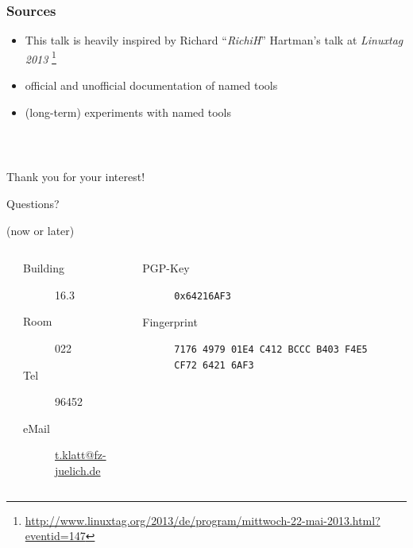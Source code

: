 \documentclass[english,hyperref={pdfpagelabels=false},aspectratio=169]{beamer}
\begin{document}
\begin{frame}
  \frametitle{Sources}
  \begin{itemize}
    \item This talk is heavily inspired by Richard ``\textit{RichiH}'' Hartman's talk at \textit{Linuxtag 2013}
      \footnote{\tiny\url{http://www.linuxtag.org/2013/de/program/mittwoch-22-mai-2013.html?eventid=147}}
    \item official and unofficial documentation of named tools
    \item (long-term) experiments with named tools
  \end{itemize}
\end{frame}

\begin{frame}
  \frametitle{~}
  \begin{center}
    {\huge Thank you for your interest!}\par
    \bigskip
    \bigskip
    \bigskip
    {\Large Questions?}\par
    {\scriptsize\color{fzjgray50}(now or later)}\par
    \bigskip
    \bigskip
    \begin{columns}
      \tiny
      \begin{column}{0.1\textwidth}
      \end{column}
      \begin{column}{0.4\textwidth}
        \begin{description}
          \item[Building] 16.3
          \item[Room] 022
          \item[Tel] 96452
          \item[eMail] \href{mailto:t.klatt@fz-juelich.de}{t.klatt@fz-juelich.de}
        \end{description}
      \end{column}
      \begin{column}{0.38\textwidth}
        \begin{description}
          \item[PGP-Key] \texttt{0x64216AF3}
          \item[Fingerprint] \texttt{7176 4979 01E4 C412 BCCC B403 F4E5 CF72 6421 6AF3}
        \end{description}
      \end{column}
      \begin{column}{0.12\textwidth}
      \end{column}
    \end{columns}
  \end{center}
\end{frame}
\end{document}
